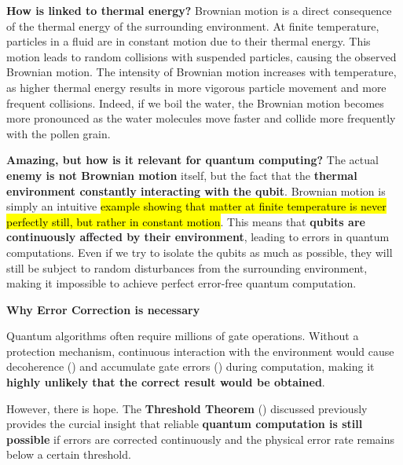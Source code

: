\begin{examplebox}
    \highspace
    \textcolor{Green3}{ \textbf{How is linked to thermal energy?}} Brownian motion is a direct consequence of the thermal energy of the surrounding environment. At finite temperature, particles in a fluid are in constant motion due to their thermal energy. This motion leads to random collisions with suspended particles, causing the observed Brownian motion. The intensity of Brownian motion increases with temperature, as higher thermal energy results in more vigorous particle movement and more frequent collisions. Indeed, if we boil the water, the Brownian motion becomes more pronounced as the water molecules move faster and collide more frequently with the pollen grain.

    \highspace
    \textcolor{Green3}{ \textbf{Amazing, but how is it relevant for quantum computing?}} The actual \textbf{enemy is not Brownian motion} itself, but the fact that the \textbf{thermal environment constantly interacting with the qubit}. Brownian motion is simply an intuitive \hl{example showing that matter at finite temperature is never perfectly still, but rather in constant motion}. This means that \textbf{qubits are continuously affected by their environment}, leading to errors in quantum computations. Even if we try to isolate the qubits as much as possible, they will still be subject to random disturbances from the surrounding environment, making it impossible to achieve perfect error-free quantum computation.
\end{examplebox}

\begin{flushleft}
    \textcolor{Green3}{ \textbf{Why Error Correction is necessary}}
\end{flushleft}
Quantum algorithms often require millions of gate operations. Without a protection mechanism, continuous interaction with the environment would cause decoherence () and accumulate gate errors () during computation, making it \textbf{highly unlikely that the correct result would be obtained}.

\highspace
However, there is hope. The \textbf{Threshold Theorem} () discussed previously provides the curcial insight that reliable \textbf{quantum computation is still possible} if errors are corrected continuously and the physical error rate remains below a certain threshold.

